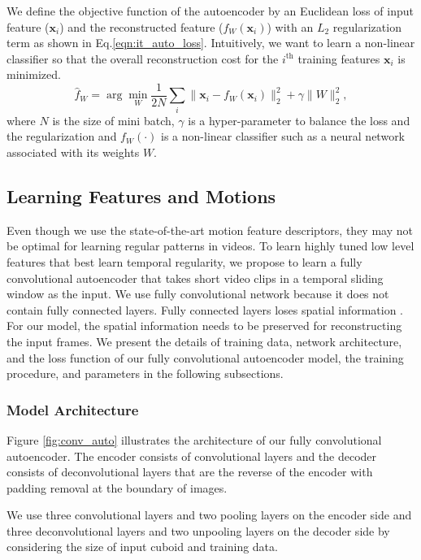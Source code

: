 \documentclass[10pt,twocolumn,letterpaper]{article}
\begin{document}
We define the objective function of the autoencoder by an Euclidean loss of input feature ($\textbf{x}_i$) and the reconstructed feature ($f_W(\textbf{x}_i)$) with an $L_2$ regularization term as shown in Eq.\ref{eqn:it_auto_loss}.
Intuitively, we want to learn a non-linear classifier so that the overall reconstruction cost for the $i^\text{th}$ training features $\textbf{x}_i$ is minimized.
\begin{equation}
	\hat{f}_W = \arg \min_{W} \frac{1}{2N} \sum_i \| \textbf{x}_i - f_W(\textbf{x}_i) \|_2^2 + \gamma \|W\|_2^2,
	\label{eqn:it_auto_loss}
\end{equation}
where $N$ is the size of mini batch, $\gamma$ is a hyper-parameter to balance the loss and the regularization and $f_W(\cdot)$ is a non-linear classifier such as a neural network associated with its weights $W$.



\subsection{Learning Features and Motions}

Even though we use the state-of-the-art motion feature descriptors, they may not be optimal for learning regular patterns in videos. 
To learn highly tuned low level features that best learn temporal regularity, we propose to learn a fully convolutional autoencoder that takes short video clips in a temporal sliding window as the input. 
We use fully convolutional network because it does not contain fully connected layers. 
Fully connected layers loses spatial information \cite{long2015fully}.  
For our model, the spatial information needs to be preserved for reconstructing the input frames.
We present the details of training data, network architecture, and the loss function of our fully convolutional autoencoder model, the training procedure, and parameters in the following subsections.


\subsubsection{Model Architecture}
Figure \ref{fig:conv_auto} illustrates the architecture of our fully convolutional autoencoder.
The encoder consists of convolutional layers \cite{krizhevsky2012imagenet} and the decoder consists of deconvolutional layers that are the reverse of the encoder with padding removal at the boundary of images. 

We use three convolutional layers and two pooling layers on the encoder side and three deconvolutional layers and two unpooling layers on the decoder side by considering the size of input cuboid and training data.
\end{document}
